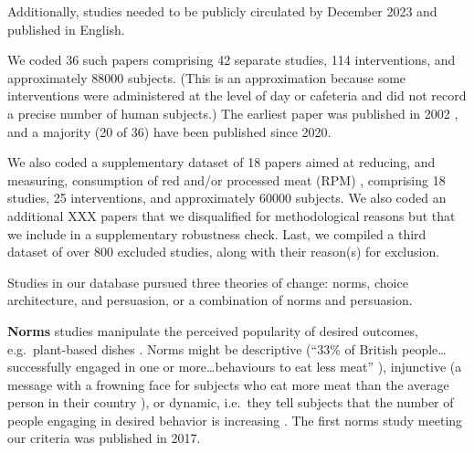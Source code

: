 \documentclass[sn-nature,pdflatex]{sn-jnl}
\begin{document}
Additionally, studies needed to be publicly circulated by December 2023
and published in English.

We coded 36 such papers
\citep{aldoh2023, allen2002, alblas2023, coker2022, griesoph2021, piester2020, sparkman2017, sparkman2020, andersson2021, kanchanachitra2020, bochmann2017, bschaden2020, cooney2016, feltz2022, haile2021, mathur2021effectiveness, peacock2017, polanco2022, sparkman2021, abrahamse2007, acharya2004, banerjee2019, berndsen2005, bertolaso2015, bianchi2022, fehrenbach2015, hatami2018, jalil2023, merrill2009, norris2014, shreedhar2021, weingarten2022, carfora2023, hennessy2016, mattson2020}
comprising 42 separate studies, 114 interventions, and approximately
88000 subjects. (This is an approximation because some interventions
were administered at the level of day or cafeteria and did not record a
precise number of human subjects.) The earliest paper was published in
2002 \citep{allen2002}, and a majority (20 of 36) have been published
since 2020.

We also coded a supplementary dataset of 18 papers aimed at reducing,
and measuring, consumption of red and/or processed meat (RPM)
\citep{carfora2017correlational, carfora2017randomised, carfora2019, carfora2019informational, delichatsios2001, dijkstra2022, emmons2005cancer, emmons2005project, jaacks2014, james2015, lee2018, perino2022, schatzkin2000, sorensen2005},
comprising 18 studies, 25 interventions, and approximately 60000
subjects. We also coded an additional XXX papers that we disqualified
for methodological reasons but that we include in a supplementary
robustness check. Last, we compiled a third dataset of over 800 excluded
studies, along with their reason(s) for exclusion.

Studies in our database pursued three theories of change: norms, choice
architecture, and persuasion, or a combination of norms and persuasion.

\textbf{Norms} studies
\citep{aldoh2023, allen2002, alblas2023, coker2022, griesoph2021, piester2020, sparkman2017, sparkman2020}
manipulate the perceived popularity of desired outcomes,
e.g.~plant-based dishes \citep{sparkman2017}. Norms might be descriptive
(``33\% of British people\ldots successfully engaged in one or
more\ldots behaviours to eat less meat'' \citep{aldoh2023}), injunctive
(a message with a frowning face for subjects who eat more meat than the
average person in their country \citep{alblas2023}), or dynamic,
i.e.~they tell subjects that the number of people engaging in desired
behavior is increasing
\citep{aldoh2023, coker2022, sparkman2017, sparkman2020}. The first
norms study meeting our criteria was published in 2017.
\end{document}
